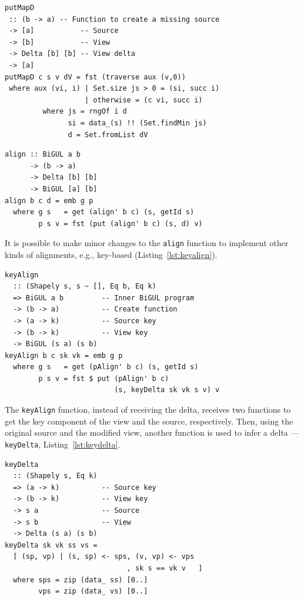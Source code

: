 \documentclass[preprint,numbers]{sigplanconf}
\begin{document}
\begin{lstlisting}[caption={Mapping of elements between to containers of the same type using a delta.},label={lst:putmapd}]
putMapD
 :: (b -> a) -- Function to create a missing source
 -> [a]           -- Source
 -> [b]           -- View
 -> Delta [b] [b] -- View delta
 -> [a]
putMapD c s v dV = fst (traverse aux (v,0))
 where aux (vi, i) | Set.size js > 0 = (si, succ i)
                   | otherwise = (c vi, succ i)
         where js = rngOf i d
               si = data_(s) !! (Set.findMin js)
               d = Set.fromList dV
\end{lstlisting}

\begin{lstlisting}[caption={Delta-based alignment function for lists.},label={lst:align1}]
align :: BiGUL a b
      -> (b -> a)
      -> Delta [b] [b]
      -> BiGUL [a] [b]
align b c d = emb g p
  where g s   = get (align' b c) (s, getId s)
        p s v = fst (put (align' b c) (s, d) v)
\end{lstlisting}

It is possible to make minor changes to the \lstinline!align! function to
implement other kinds of alignments, e.g., key-based
(Listing~\ref{lst:keyalign}).

\begin{lstlisting}[caption={Key-based alignment function for lists.},label={lst:keyalign}]
keyAlign
  :: (Shapely s, s ~ [], Eq b, Eq k)
  => BiGUL a b         -- Inner BiGUL program
  -> (b -> a)          -- Create function
  -> (a -> k)          -- Source key
  -> (b -> k)          -- View key
  -> BiGUL (s a) (s b)
keyAlign b c sk vk = emb g p
  where g s   = get (pAlign' b c) (s, getId s)
        p s v = fst $ put (pAlign' b c)
                          (s, keyDelta sk vk s v) v
\end{lstlisting}

The \lstinline!keyAlign! function, instead of receiving the delta, receives two
functions to get the key component of the view and the source, respectively.
Then, using the original source and the modified view, another function is used
to infer a delta --- \lstinline!keyDelta!, Listing~\ref{lst:keydelta}.

\begin{lstlisting}[caption={Calculation of deltas using key-based alignment.},label={lst:keydelta}]
keyDelta
  :: (Shapely s, Eq k)
  => (a -> k)          -- Source key
  -> (b -> k)          -- View key
  -> s a               -- Source
  -> s b               -- View
  -> Delta (s a) (s b)
keyDelta sk vk ss vs =
  [ (sp, vp) | (s, sp) <- sps, (v, vp) <- vps
                             , sk s == vk v   ]
  where sps = zip (data_ ss) [0..]
        vps = zip (data_ vs) [0..]
\end{lstlisting}
\end{document}
